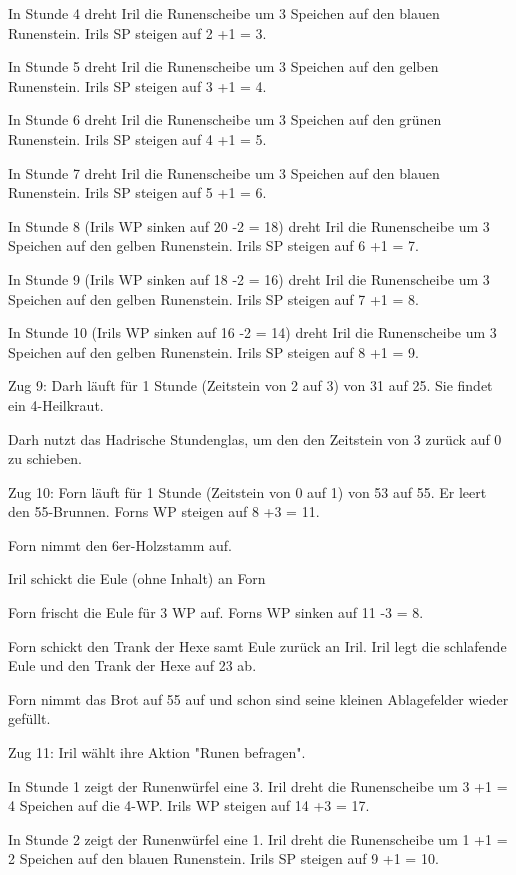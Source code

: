 \documentclass[10pt, a4paper, oneside]{book}
\begin{document}
{In Stunde 4 dreht Iril die Runenscheibe um 3 Speichen auf den blauen Runenstein. Irils SP steigen auf 2 +1 = 3.

In Stunde 5 dreht Iril die Runenscheibe um 3 Speichen auf den gelben Runenstein. Irils SP steigen auf 3 +1 = 4.

In Stunde 6 dreht Iril die Runenscheibe um 3 Speichen auf den grünen Runenstein. Irils SP steigen auf 4 +1 = 5.

In Stunde 7 dreht Iril die Runenscheibe um 3 Speichen auf den blauen Runenstein. Irils SP steigen auf 5 +1 = 6.

In Stunde 8 (Irils WP sinken auf 20 -2 = 18) dreht Iril die Runenscheibe um 3 Speichen auf den gelben Runenstein. Irils SP steigen auf 6 +1 = 7.

In Stunde 9 (Irils WP sinken auf 18 -2 = 16) dreht Iril die Runenscheibe um 3 Speichen auf den gelben Runenstein. Irils SP steigen auf 7 +1 = 8.

In Stunde 10 (Irils WP sinken auf 16 -2 = 14) dreht Iril die Runenscheibe um 3 Speichen auf den gelben Runenstein. Irils SP steigen auf 8 +1 = 9.



Zug 9: Darh läuft für 1 Stunde (Zeitstein von 2 auf 3) von 31 auf 25. Sie findet ein 4-Heilkraut.

Darh nutzt das Hadrische Stundenglas, um den den Zeitstein von 3 zurück auf 0 zu schieben.



Zug 10: Forn läuft für 1 Stunde (Zeitstein von 0 auf 1) von 53 auf 55. Er leert den 55-Brunnen. Forns WP steigen auf 8 +3 = 11.

Forn nimmt den 6er-Holzstamm auf.

Iril schickt die Eule (ohne Inhalt) an Forn

Forn frischt die Eule für 3 WP auf. Forns WP sinken auf 11 -3 = 8.

Forn schickt den Trank der Hexe samt Eule zurück an Iril. Iril legt die schlafende Eule und den Trank der Hexe auf 23 ab.

Forn nimmt das Brot auf 55 auf und schon sind seine kleinen Ablagefelder wieder gefüllt.



Zug 11: Iril wählt ihre Aktion "Runen befragen".

In Stunde 1 zeigt der Runenwürfel eine 3. Iril dreht die Runenscheibe um 3 +1 = 4 Speichen auf die 4-WP. Irils WP steigen auf 14 +3 = 17.

In Stunde 2 zeigt der Runenwürfel eine 1. Iril dreht die Runenscheibe um 1 +1 = 2 Speichen auf den blauen Runenstein. Irils SP steigen auf 9 +1 = 10.

}
\end{document}
